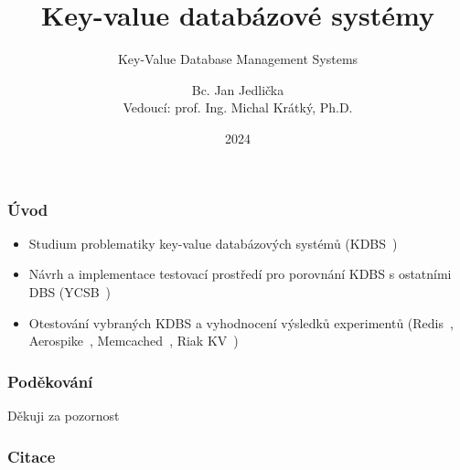\documentclass{beamer}
\title[Diplomová práce - KDBS]{Key-value databázové systémy}
\subtitle{Key-Value Database Management Systems}
\author[Bc. Jan Jedlička, JED0050]{Bc. Jan Jedlička \\ {\footnotesize Vedoucí: prof. Ing. Michal Krátký, Ph.D.}}
\institute[]{FEI, VŠB-TUO}
\date{2024}
\begin{document}
	
	\frame{\titlepage}
	
	\begin{frame}
		\frametitle{Úvod}
		
		\begin{itemize}
			\item Studium problematiky key-value databázových systémů (KDBS~\cite{amaz-key-value-db})
			\item Návrh a implementace testovací prostředí pro porovnání KDBS s ostatními DBS (YCSB~\cite{ycsb})
			\item Otestování vybraných KDBS a vyhodnocení výsledků experimentů (Redis~\cite{redis}, Aerospike~\cite{aerospike}, Memcached~\cite{memcached}, Riak KV~\cite{riak})
		\end{itemize}
		
	\end{frame}

	\begin{frame}
		\frametitle{Poděkování}
		
		\begin{center}
			\Huge
			Děkuji za pozornost
		\end{center}
		
	\end{frame}

	\begin{frame}
		\frametitle{Citace}
		
		\printbibliography
		
	\end{frame}
	
\end{document}

